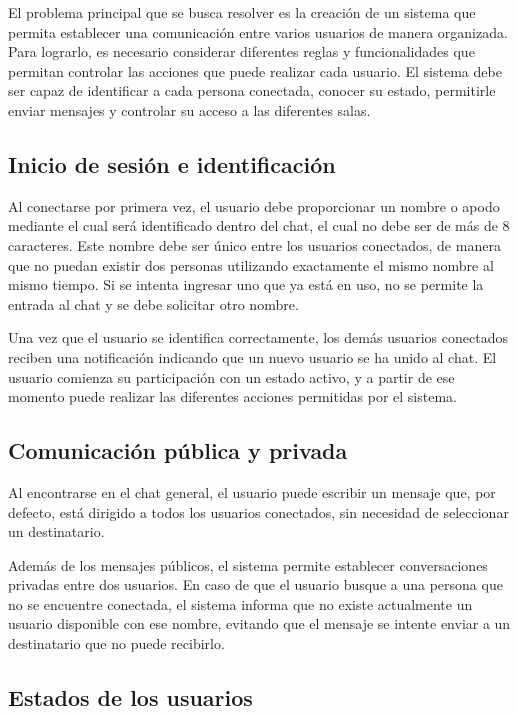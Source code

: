 \documentclass[12pt,letterpaper]{article}
\begin{document}
El problema principal que se busca resolver es la creación de un sistema
que permita establecer una comunicación entre varios usuarios de manera
organizada. Para lograrlo, es necesario considerar diferentes reglas y
funcionalidades que permitan controlar las acciones que puede realizar
cada usuario. El sistema debe ser capaz de identificar a cada persona
conectada, conocer su estado, permitirle enviar mensajes y controlar su
acceso a las diferentes salas.

\subsection{Inicio de sesión e identificación}

Al conectarse por primera vez, el usuario debe proporcionar un nombre o
apodo mediante el cual será identificado dentro del chat, el cual no
debe ser de más de 8 caracteres. Este nombre debe ser único entre los
usuarios conectados, de manera que no puedan existir dos personas
utilizando exactamente el mismo nombre al mismo tiempo. Si se intenta
ingresar uno que ya está en uso, no se permite la entrada al chat y se
debe solicitar otro nombre.

Una vez que el usuario se identifica correctamente, los demás usuarios
conectados reciben una notificación indicando que un nuevo usuario se ha
unido al chat. El usuario comienza su participación con un estado
activo, y a partir de ese momento puede realizar las diferentes acciones
permitidas por el sistema.

\subsection{Comunicación pública y privada}

Al encontrarse en el chat general, el usuario puede escribir un mensaje
que, por defecto, está dirigido a todos los usuarios conectados, sin
necesidad de seleccionar un destinatario.

Además de los mensajes públicos, el sistema permite establecer
conversaciones privadas entre dos usuarios. En caso de que el usuario
busque a una persona que no se encuentre conectada, el sistema informa
que no existe actualmente un usuario disponible con ese nombre, evitando
que el mensaje se intente enviar a un destinatario que no puede
recibirlo.

\subsection{Estados de los usuarios}
\end{document}

